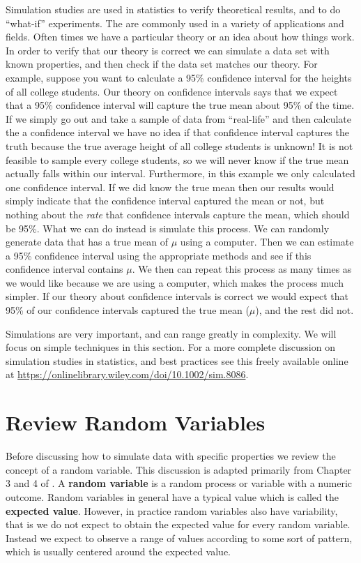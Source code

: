 \documentclass[
]{book}
\begin{document}
Simulation studies are used in statistics to verify theoretical results, and to do ``what-if'' experiments. The are commonly used in a variety of applications and fields. Often times we have a particular theory or an idea about how things work. In order to verify that our theory is correct we can simulate a data set with known properties, and then check if the data set matches our theory. For example, suppose you want to calculate a 95\% confidence interval for the heights of all college students. Our theory on confidence intervals says that we expect that a 95\% confidence interval will capture the true mean about 95\% of the time. If we simply go out and take a sample of data from ``real-life'' and then calculate the a confidence interval we have no idea if that confidence interval captures the truth because the true average height of all college students is unknown! It is not feasible to sample every college students, so we will never know if the true mean actually falls within our interval. Furthermore, in this example we only calculated one confidence interval. If we did know the true mean then our results would simply indicate that the confidence interval captured the mean or not, but nothing about the \emph{rate} that confidence intervals capture the mean, which should be 95\%. What we can do instead is simulate this process. We can randomly generate data that has a true mean of \(\mu\) using a computer. Then we can estimate a 95\% confidence interval using the appropriate methods and see if this confidence interval contains \(\mu\). We then can repeat this process as many times as we would like because we are using a computer, which makes the process much simpler. If our theory about confidence intervals is correct we would expect that 95\% of our confidence intervals captured the true mean (\(\mu\)), and the rest did not.

Simulations are very important, and can range greatly in complexity. We will focus on simple techniques in this section. For a more complete discussion on simulation studies in statistics, and best practices see this freely available online at \url{https://onlinelibrary.wiley.com/doi/10.1002/sim.8086}.

\hypertarget{review-random-variables}{%
\section{Review Random Variables}\label{review-random-variables}}

Before discussing how to simulate data with specific properties we review the concept of a random variable. This discussion is adapted primarily from Chapter 3 and 4 of \citet{OpenIntro}. A \textbf{random variable} is a random process or variable with a numeric outcome. Random variables in general have a typical value which is called the \textbf{expected value}. However, in practice random variables also have variability, that is we do not expect to obtain the expected value for every random variable. Instead we expect to observe a range of values according to some sort of pattern, which is usually centered around the expected value.
\end{document}

